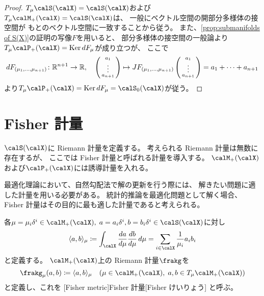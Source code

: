\documentclass[report]{jlreq}
\begin{document}
\begin{proof}
    $T_{\mu} \calS(\calX) = \calS(\calX)$および
    $T_{\mu} \calM_+(\calX) = \calS(\calX)$は、
    一般にベクトル空間の開部分多様体の接空間が
    もとのベクトル空間に一致することから従う。
    また、\cref{prop:submanifolds of S(X)}の証明の写像$F$を用いると、
    部分多様体の接空間の一般論より
    $T_{\mu} \calP_+(\calX) = \Ker dF_\mu$が成り立つが、
    ここで
    \begin{equation}
        dF_{(\mu_1, \dots, \mu_{n + 1})}
            \colon \mathbb{R}^{n + 1} \to \mathbb{R},
            \quad
            \left({\begin{smallmatrix}
                a_1 \\ \vdots \\ a_{n + 1}
            \end{smallmatrix}}\right)
            \mapsto
            JF_{(\mu_1, \dots, \mu_{n + 1})}
            \left({\begin{smallmatrix}
                a_1 \\ \vdots \\ a_{n + 1}
            \end{smallmatrix}}\right)
            = a_1 + \dots + a_{n + 1}
    \end{equation}
    より$T_{\mu} \calP_+(\calX) = \Ker dF_\mu = \calS_0(\calX)$が従う。
\end{proof}

%
\section{Fisher 計量}

$\calS(\calX)$に Riemann 計量を定義する。
考えられる Riemann 計量は無数に存在するが、
ここでは Fisher 計量と呼ばれる計量を導入する。
$\calM_+(\calX)$および$\calP_+(\calX)$には誘導計量を入れる。

最適化理論において、自然勾配法で解の更新を行う際には、
解きたい問題に適した計量を用いる必要がある。
統計的推論を最適化問題として解く場合、
Fisher 計量はその目的に最も適した計量であると考えられる。


\begin{definition}[Fisher 計量]
    各$\mu = \mu_i \delta^i \in \calM_+(\calX), \;
        a = a_i \delta^i, b = b_i \delta^i \in \calS(\calX)$に対し
    \begin{equation}
        \langle a, b \rangle_\mu
            \coloneqq \int_\calX \dd[a]{\mu} \dd[b]{\mu} \, d\mu
            = \sum_{i \in \calX} \frac{1}{\mu_i} a_i b_i
    \end{equation}
    と定義する。
    $\calM_+(\calX)$上の Riemann 計量$\frakg$を
    \begin{equation}
        \frakg_\mu(a, b)
            \coloneqq \langle a, b \rangle_\mu
            \quad (\mu \in \calM_+(\calX), \; a, b \in T_\mu \calM_+(\calX))
    \end{equation}
    と定義し、これを
    [Fisher metric]{Fisher 計量}[Fisher けいりょう]
    と呼ぶ。
\end{definition}
\end{document}
